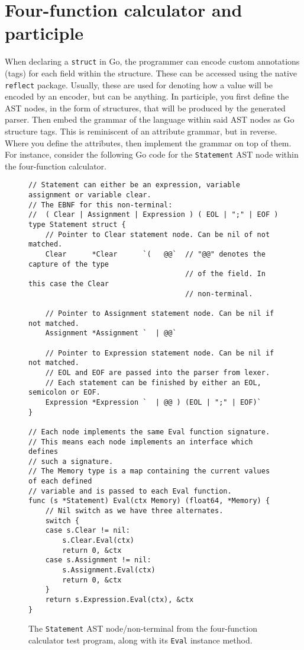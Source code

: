 \section{Four-function calculator and participle}
\label{sec:four-function-calc}

When declaring a \verb|struct| in Go, the programmer can encode custom annotations (tags) for each field within the structure. These can be accessed using the native \verb|reflect| package. Usually, these are used for denoting how a value will be encoded by an encoder, but can be anything. In participle, you first define the AST nodes, in the form of structures, that will be produced by the generated parser. Then embed the grammar of the language within said AST nodes as Go structure tags. This is reminiscent of an attribute grammar, but in reverse. Where you define the attributes, then implement the grammar on top of them. For instance, consider the following Go code for the \verb|Statement| AST node within the four-function calculator.

\begin{figure}[H]
    \begin{verbatim}
// Statement can either be an expression, variable assignment or variable clear.
// The EBNF for this non-terminal:
//  ( Clear | Assignment | Expression ) ( EOL | ";" | EOF )
type Statement struct {
    // Pointer to Clear statement node. Can be nil of not matched.
    Clear      *Clear      `(   @@`  // "@@" denotes the capture of the type 
                                     // of the field. In this case the Clear
                                     // non-terminal.

    // Pointer to Assignment statement node. Can be nil if not matched.
    Assignment *Assignment `  | @@`

    // Pointer to Expression statement node. Can be nil if not matched.
    // EOL and EOF are passed into the parser from lexer.
    // Each statement can be finished by either an EOL, semicolon or EOF.
    Expression *Expression `  | @@ ) (EOL | ";" | EOF)`
}

// Each node implements the same Eval function signature.
// This means each node implements an interface which defines
// such a signature.
// The Memory type is a map containing the current values of each defined
// variable and is passed to each Eval function.
func (s *Statement) Eval(ctx Memory) (float64, *Memory) {
    // Nil switch as we have three alternates.
    switch {
    case s.Clear != nil:
        s.Clear.Eval(ctx)
        return 0, &ctx
    case s.Assignment != nil:
        s.Assignment.Eval(ctx)
        return 0, &ctx
    }
    return s.Expression.Eval(ctx), &ctx
}
    \end{verbatim}
    \label{fig:four-func-calc-statement-ast-node}
    \cprotect\caption{The \verb|Statement| AST node/non-terminal from the four-function calculator test program, along with its \verb|Eval| instance method.}
\end{figure}

